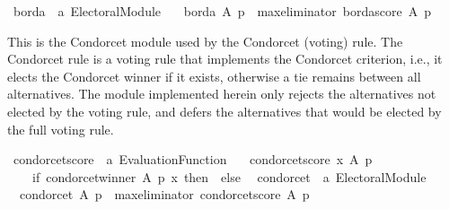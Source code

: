 \begin{isabellebody}
\isanewline
{}\isamarkupfalse%
\ borda\ {\isacharcolon}{\kern0pt}{\isacharcolon}{\kern0pt}\ {\isachardoublequoteopen}{\isacharprime}{\kern0pt}a\ Electoral{\isacharunderscore}{\kern0pt}Module{\isachardoublequoteclose}\ \isanewline
\ \ {\isachardoublequoteopen}borda\ A\ p\ {\isacharequal}{\kern0pt}\ max{\isacharunderscore}{\kern0pt}eliminator\ borda{\isacharunderscore}{\kern0pt}score\ A\ p{\isachardoublequoteclose}%
\isadelimdocument
%
\endisadelimdocument
%
\isatagdocument
%
\isamarkuptrue%
%
\endisatagdocument
{\isafolddocument}%
%
\isadelimdocument
%
\endisadelimdocument
%
\begin{isamarkuptext}%
This is the Condorcet module used by the Condorcet (voting) rule. The Condorcet
rule is a voting rule that implements the Condorcet criterion, i.e., it elects
the Condorcet winner if it exists, otherwise a tie remains between all
alternatives. The module implemented herein only rejects the alternatives not
elected by the voting rule, and defers the alternatives that would be elected
by the full voting rule.%
\end{isamarkuptext}\isamarkuptrue%
%
\isadelimdocument
%
\endisadelimdocument
%
\isatagdocument
%
\isamarkuptrue%
%
\endisatagdocument
{\isafolddocument}%
%
\isadelimdocument
%
\endisadelimdocument
{}\isamarkupfalse%
\ condorcet{\isacharunderscore}{\kern0pt}score\ {\isacharcolon}{\kern0pt}{\isacharcolon}{\kern0pt}\ {\isachardoublequoteopen}{\isacharprime}{\kern0pt}a\ Evaluation{\isacharunderscore}{\kern0pt}Function{\isachardoublequoteclose}\ \isanewline
\ \ {\isachardoublequoteopen}condorcet{\isacharunderscore}{\kern0pt}score\ x\ A\ p\ {\isacharequal}{\kern0pt}\isanewline
\ \ \ \ {\isacharparenleft}{\kern0pt}if\ {\isacharparenleft}{\kern0pt}condorcet{\isacharunderscore}{\kern0pt}winner\ A\ p\ x{\isacharparenright}{\kern0pt}\ then\ {}\ else\ {}{\isacharparenright}{\kern0pt}{\isachardoublequoteclose}\isanewline
\isanewline
{}\isamarkupfalse%
\ condorcet\ {\isacharcolon}{\kern0pt}{\isacharcolon}{\kern0pt}\ {\isachardoublequoteopen}{\isacharprime}{\kern0pt}a\ Electoral{\isacharunderscore}{\kern0pt}Module{\isachardoublequoteclose}\ \isanewline
\ \ {\isachardoublequoteopen}condorcet\ A\ p\ {\isacharequal}{\kern0pt}\ {\isacharparenleft}{\kern0pt}max{\isacharunderscore}{\kern0pt}eliminator\ condorcet{\isacharunderscore}{\kern0pt}score{\isacharparenright}{\kern0pt}\ A\ p{\isachardoublequoteclose}%
\isadelimdocument

\end{isabellebody}
